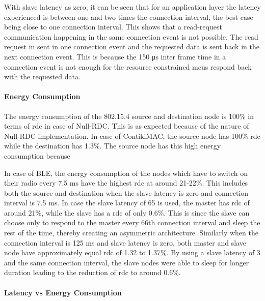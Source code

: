With slave latency as zero, it can be seen that for an application layer the latency experienced is between one and two times the connection interval, the best case being close to one connection interval. This shows that a read-request communication happening in the same connection event is not possible. The read request in sent in one connection event and the requested data is sent back in the next connection event. This is because the 150 \si{\micro \second} inter frame time in a connection event is not enough for the resource constrained \glspl{mcu} respond back with the requested data.

\paragraph{Energy Consumption}
The energy consumption of the 802.15.4 source and destination node is 100\% in terms of \gls{rdc} in case of Null-RDC. This is as expected because of the nature of Null-RDC implementation. In case of ContikiMAC, the source node has 100\% \gls{rdc} while the destination has 1.3\%. The source node has this high energy consumption because  

In case of BLE, the energy consumption of the nodes which have to switch on their radio every 7.5 ms have the highest \gls{rdc} at around 21-22\%. This includes both the source and destination when the slave latency is zero and connection interval is 7.5 ms. In case the slave latency of 65 is used, the master has \gls{rdc} of around 21\%, while the slave has a \gls{rdc} of only 0.6\%. This is since the slave  can choose only to respond to the master every 66th connection interval and sleep the rest of the time, thereby creating an asymmetric architecture. Similarly when the connection interval is 125 ms and slave latency is zero, both master and slave node have 
approximately equal \gls{rdc} of 1.32 to 1.37\%. By using a slave latency of 3 and the same connection interval, the slave nodes were able to sleep for longer duration leading to the reduction of \gls{rdc} to around 0.6\%.

\paragraph{Latency vs Energy Consumption}

